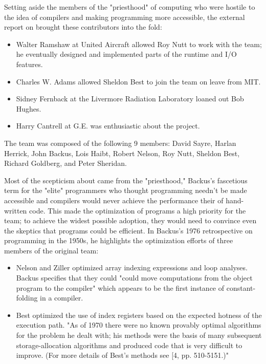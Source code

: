 Setting aside the members of the "priesthood" of computing who were hostile to the
idea of compilers and making programming more accessible, the external report on \FTN{}
brought these contributors into the fold:
\begin{itemize}
    \item Walter Ramshaw at United Aircraft allowed Roy Nutt to work with the team;
            he eventually designed and implemented parts of the runtime and I/O features.
    \item Charles W. Adams allowed Sheldon Best to join the team on leave from MIT.
    \item Sidney Fernback at the Livermore Radiation Laboratory loaned out Bob Hughes.
    \item Harry Cantrell at G.E. was enthusiastic about the project.
\end{itemize}

The team was composed of the following 9 members: 
David Sayre, Harlan Herrick, John Backus, 
Lois Haibt, Robert Nelson, Roy Nutt, 
Sheldon Best, Richard Goldberg, and Peter Sheridan.

Most of the scepticism about \FTN{} came from the "priesthood," Backus's fascetious term
for the "elite" programmers who thought programming needn't be made accessible 
and compilers would never achieve the performance their of hand-written code.
This made the optimization of \FTN{} programs a high priority for the team; to achieve
the widest possible adoption, they would need to convince even the skeptics that
\FTN{} programs could be efficient.
In Backus's 1976 retrospective on programming in the 1950s\cite{Backus_1980_Programming_in_America_in_1950s},
he highlights the optimization efforts of three members of the original team:

\begin{itemize}
    \item Nelson and Ziller optimized array indexing expressions and loop analyses.
          Backus specifies that they could "could move computations from the object program to the compiler"
          which appears to be the first instance of constant-folding in a compiler.
    \item Best optimized the use of index registers based on the expected hotness of the execution path.
            "As of 1970 there were no known provably optimal algorithms for the problem 
            he dealt with; his methods were the basis of many subsequent storage-allocation 
            algorithms and produced code that is very difficult to improve. (For more 
            details of Best's methods see [4, pp. 510-5151.)"
\end{itemize}

